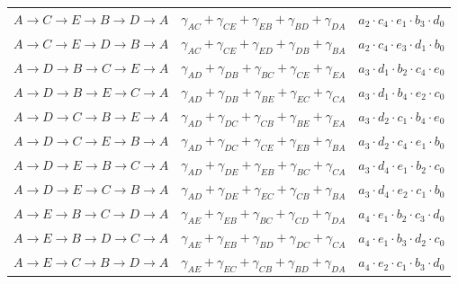 \documentclass[msc,oneside]{ubcthesis}
\begin{document}
\begin{table}[h]
\begin{tabular}{|c|c|c|}
$A \rightarrow C \rightarrow E \rightarrow B \rightarrow D \rightarrow A$ & $ \gamma_{AC} + \gamma_{CE} + \gamma_{EB} + \gamma_{BD} + \gamma_{DA}$ & $a_2  \cdot c_4 \cdot e_1 \cdot b_3 \cdot d_0$ \\
$A \rightarrow C \rightarrow E \rightarrow D \rightarrow B \rightarrow A$ & $ \gamma_{AC} + \gamma_{CE} + \gamma_{ED} + \gamma_{DB} + \gamma_{BA}$ & $a_2  \cdot c_4 \cdot e_3 \cdot d_1 \cdot b_0$ \\
$A \rightarrow D \rightarrow B \rightarrow C \rightarrow E \rightarrow A$ & $ \gamma_{AD} + \gamma_{DB} + \gamma_{BC} + \gamma_{CE} + \gamma_{EA}$ & $a_3  \cdot d_1 \cdot b_2 \cdot c_4 \cdot e_0$ \\
$A \rightarrow D \rightarrow B \rightarrow E \rightarrow C \rightarrow A$ & $ \gamma_{AD} + \gamma_{DB} + \gamma_{BE} + \gamma_{EC} + \gamma_{CA}$ & $a_3  \cdot d_1 \cdot b_4 \cdot e_2 \cdot c_0$ \\
$A \rightarrow D \rightarrow C \rightarrow B \rightarrow E \rightarrow A$ & $ \gamma_{AD} + \gamma_{DC} + \gamma_{CB} + \gamma_{BE} + \gamma_{EA}$ & $a_3  \cdot d_2 \cdot c_1 \cdot b_4 \cdot e_0$ \\
$A \rightarrow D \rightarrow C \rightarrow E \rightarrow B \rightarrow A$ & $ \gamma_{AD} + \gamma_{DC} + \gamma_{CE} + \gamma_{EB} + \gamma_{BA}$ & $a_3  \cdot d_2 \cdot c_4 \cdot e_1 \cdot b_0$ \\
$A \rightarrow D \rightarrow E \rightarrow B \rightarrow C \rightarrow A$ & $ \gamma_{AD} + \gamma_{DE} + \gamma_{EB} + \gamma_{BC} + \gamma_{CA}$ & $a_3  \cdot d_4 \cdot e_1 \cdot b_2 \cdot c_0$ \\
$A \rightarrow D \rightarrow E \rightarrow C \rightarrow B \rightarrow A$ & $ \gamma_{AD} + \gamma_{DE} + \gamma_{EC} + \gamma_{CB} + \gamma_{BA}$ & $a_3  \cdot d_4 \cdot e_2 \cdot c_1 \cdot b_0$ \\
$A \rightarrow E \rightarrow B \rightarrow C \rightarrow D \rightarrow A$ & $ \gamma_{AE} + \gamma_{EB} + \gamma_{BC} + \gamma_{CD} + \gamma_{DA}$ & $a_4  \cdot e_1 \cdot b_2 \cdot c_3 \cdot d_0$ \\
$A \rightarrow E \rightarrow B \rightarrow D \rightarrow C \rightarrow A$ & $ \gamma_{AE} + \gamma_{EB} + \gamma_{BD} + \gamma_{DC} + \gamma_{CA}$ & $a_4  \cdot e_1 \cdot b_3 \cdot d_2 \cdot c_0$ \\
$A \rightarrow E \rightarrow C \rightarrow B \rightarrow D \rightarrow A$ & $ \gamma_{AE} + \gamma_{EC} + \gamma_{CB} + \gamma_{BD} + \gamma_{DA}$ & $a_4  \cdot e_2 \cdot c_1 \cdot b_3 \cdot d_0$ \\

\end{tabular}
\end{table}
\end{document}
